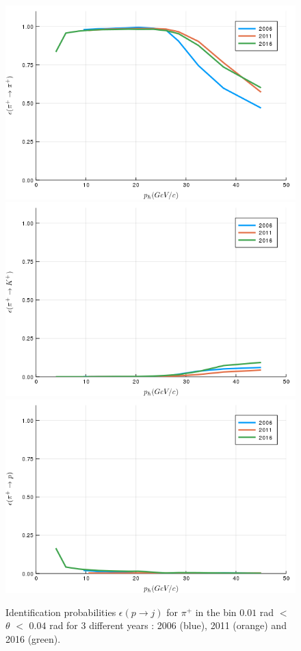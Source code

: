 \begin{figure}[!h]
  \centering
	\includegraphics[scale=0.35]{./gfx/t1/pip2pip.png}
  \includegraphics[scale=0.35]{./gfx/t1/pip2kp.png}
  \includegraphics[scale=0.35]{./gfx/t1/pip2pp.png}
	\caption{Identification probabilities $\epsilon(p \rightarrow j)$ for $\pi^+$ in the bin $0.01$ rad $<$ $\theta$ $<$ $0.04$ rad for 3 different years : 2006 (blue), 2011 (orange) and 2016 (green).}
	\label{pic:comppip}
\end{figure}

